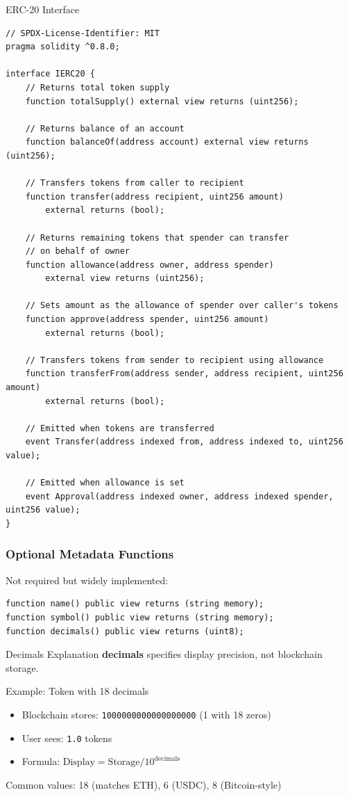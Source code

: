 \documentclass[11pt,a4paper]{article}
\begin{document}
\begin{examplebox}{ERC-20 Interface}
\begin{lstlisting}[language=Solidity]
// SPDX-License-Identifier: MIT
pragma solidity ^0.8.0;

interface IERC20 {
    // Returns total token supply
    function totalSupply() external view returns (uint256);

    // Returns balance of an account
    function balanceOf(address account) external view returns (uint256);

    // Transfers tokens from caller to recipient
    function transfer(address recipient, uint256 amount)
        external returns (bool);

    // Returns remaining tokens that spender can transfer
    // on behalf of owner
    function allowance(address owner, address spender)
        external view returns (uint256);

    // Sets amount as the allowance of spender over caller's tokens
    function approve(address spender, uint256 amount)
        external returns (bool);

    // Transfers tokens from sender to recipient using allowance
    function transferFrom(address sender, address recipient, uint256 amount)
        external returns (bool);

    // Emitted when tokens are transferred
    event Transfer(address indexed from, address indexed to, uint256 value);

    // Emitted when allowance is set
    event Approval(address indexed owner, address indexed spender, uint256 value);
}
\end{lstlisting}
\end{examplebox}

\subsubsection{Optional Metadata Functions}

Not required but widely implemented:

\begin{lstlisting}[language=Solidity]
function name() public view returns (string memory);
function symbol() public view returns (string memory);
function decimals() public view returns (uint8);
\end{lstlisting}

\begin{keybox}{Decimals Explanation}
\textbf{decimals} specifies display precision, not blockchain storage.

Example: Token with 18 decimals
\begin{itemize}
  \item Blockchain stores: \texttt{1000000000000000000} (1 with 18 zeros)
  \item User sees: \texttt{1.0} tokens
  \item Formula: $\text{Display} = \text{Storage} / 10^{\text{decimals}}$
\end{itemize}

Common values: 18 (matches ETH), 6 (USDC), 8 (Bitcoin-style)
\end{keybox}
\end{document}
